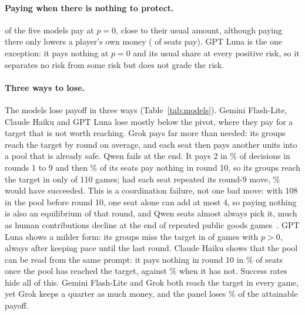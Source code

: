 \paragraph{Paying when there is nothing to protect.}
\GridZeroModelsPayingCap{} of the five models pay at $p=0$, close to their usual amount,
although paying there only lowers a player's own money (\GridZeroPaying{} of
\GridZeroSeats{} seats pay). GPT Luna is the one exception: it pays nothing at $p=0$ and its
usual share at every positive risk, so it separates no risk from some risk but does not
grade the risk.

\paragraph{Three ways to lose.}
The models lose payoff in three ways (Table~\ref{tab:models}). Gemini Flash-Lite, Claude
Haiku and GPT Luna lose mostly below the pivot, where they pay for a target that is not worth
reaching. Grok pays far more than needed: its groups reach the target by round
\GridGrokSecuredRound{} on average, and each seat then pays another \GridGrokWaste{} units
into a pool that is already safe. Qwen fails at the end. It pays 2 in
\GridQwenRoundsOneNinePct\% of decisions in rounds 1 to 9 and then \GridQwenLastZeroPct\% of
its seats pay nothing in round 10, so its groups reach the target in only \GridQwenReach{} of
110 games; had each seat repeated its round-9 move, \GridQwenFixReachPct\% would have
succeeded. This is a coordination failure, not one bad move: with 108 in the pool before
round 10, one seat alone can add at most 4, so paying nothing is also an equilibrium of that
round, and Qwen seats almost always pick it, much as human contributions decline at the end
of repeated public goods games~\cite{andreoni1988free}. GPT Luna shows a milder form: its
groups miss the target in \GridLunaMiss{} of \GridLunaGames{} games with $p>0$, always after
keeping pace until the last round. Claude Haiku shows that the pool can be read from the same
prompt: it pays nothing in round 10 in \GridHaikuStopPct\% of seats once the pool has reached
the target, against \GridHaikuStopOtherPct\% when it has not. Success rates hide all of this.
Gemini Flash-Lite and Grok both reach the target in every game, yet Grok keeps a quarter as
much money, and the panel loses \GridLossPanelPct\% of the attainable payoff.

\begin{table}[t]
\caption{Self-play summary over the risk grid, using expected payoffs. \emph{Pays at
$p{=}0$} is the mean seat total where paying is dominated. \emph{Exact split} is the share of
seats paying 2 in all ten rounds. \emph{Target} is the share of games that reach it, and
\emph{Payoff} is the expected payoff per seat; the optimum averages \GridOptMean{} over the
grid. \emph{Lost} is the share of the attainable payoff $\mathrm{opt}(p)$ that was lost, and
\emph{Main loss} is its largest cause: paying toward the target below $\popt$, paying beyond
120, or missing the target at or above $\popt$, which for Qwen happens in the last round.}
\label{tab:models}

\end{table}

